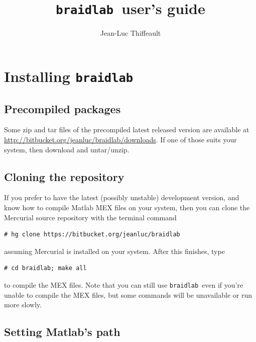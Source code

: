 \documentclass[12pt]{article}
\newcommand{\braidlab}{\texttt{braidlab}}%
\begin{document}
\lstset{language=Matlab}
\lstset{breaklines=true}

\lstset{%
basicstyle=\small\ttfamily,
keywordstyle=\small\ttfamily,
identifierstyle=,
commentstyle=\small\rmfamily\itshape,%
stringstyle=\small\ttfamily,
showstringspaces=false}


\title{\braidlab\ user's guide}
\author{Jean-Luc Thiffeault}
\date{}
\maketitle

\section{Installing \braidlab}

\subsection{Precompiled packages}

Some zip and tar files of the precompiled latest released version are
available at \url{http://bitbucket.org/jeanluc/braidlab/downloads}.  If one of
those suits your system, then download and untar/unzip.


\subsection{Cloning the repository}

If you prefer to have the latest (possibly unstable) development version, and
know how to compile Matlab MEX files on your system, then you can clone the
Mercurial source repository with the terminal command
\begin{lstlisting}[frame=single,framerule=0pt,escapechar=*]
# hg clone https://bitbucket.org/jeanluc/braidlab
\end{lstlisting}
assuming Mercurial is installed on your system.  After this finishes, type
\begin{lstlisting}[frame=single,framerule=0pt,escapechar=*]
# cd braidlab; make all
\end{lstlisting}
to compile the MEX files.  Note that you can still use \braidlab\ even if
you're unable to compile the MEX files, but some commands will be unavailable
or run more slowly.


\subsection{Setting Matlab's path}
\end{document}
